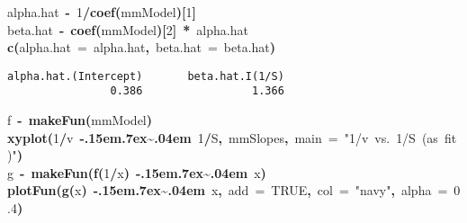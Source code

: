 \documentclass{article}\usepackage{graphicx, color}
\makeatletter
\newcommand{\hlnumber}[1]{\textcolor[rgb]{0,0,0}{#1}}%
\newcommand{\hlfunctioncall}[1]{\textcolor[rgb]{0.501960784313725,0,0.329411764705882}{\textbf{#1}}}%
\newcommand{\hlstring}[1]{\textcolor[rgb]{0.6,0.6,1}{#1}}%
\newcommand{\hlkeyword}[1]{\textcolor[rgb]{0,0,0}{\textbf{#1}}}%
\newcommand{\hlargument}[1]{\textcolor[rgb]{0.690196078431373,0.250980392156863,0.0196078431372549}{#1}}%
\newcommand{\hlassignement}[1]{\textcolor[rgb]{0,0,0}{\textbf{#1}}}%
\newcommand{\hlsymbol}[1]{\textcolor[rgb]{0,0,0}{#1}}%
\def\urltilda{\kern -.15em\lower .7ex\hbox{\~{}}\kern .04em}%
\newcommand{\hlstd}[1]{\textcolor[rgb]{0,0,0}{#1}}%
\newenvironment{kframe}{%
 \def\FrameCommand##1{\hskip\@totalleftmargin \hskip-\fboxsep
 \colorbox{shadecolor}{##1}\hskip-\fboxsep
     \hskip-\linewidth \hskip-\@totalleftmargin \hskip\columnwidth}%
 \MakeFramed {\advance\hsize-\width
   \@totalleftmargin\z@ \linewidth\hsize
   \@setminipage}}%
 {\par\unskip\endMakeFramed}
\newenvironment{knitrout}{}{} %
\makeatother
\begin{document}
\begin{knitrout}
\begin{kframe}
\begin{verbatim}
\end{verbatim}
\begin{flushleft}
\ttfamily\noindent
\hlsymbol{alpha.hat}{\ }\hlassignement{\usebox{\hlnormalsizeboxlessthan}-}{\ }\hlnumber{1}\hlkeyword{/}\hlfunctioncall{coef}\hlkeyword{(}\hlsymbol{mmModel}\hlkeyword{)}\hlkeyword{[}\hlnumber{1}\hlkeyword{]}\hspace*{\fill}\\
\hlstd{}\hlsymbol{beta.hat}{\ }\hlassignement{\usebox{\hlnormalsizeboxlessthan}-}{\ }\hlfunctioncall{coef}\hlkeyword{(}\hlsymbol{mmModel}\hlkeyword{)}\hlkeyword{[}\hlnumber{2}\hlkeyword{]}{\ }\hlkeyword{*}{\ }\hlsymbol{alpha.hat}\hspace*{\fill}\\
\hlstd{}\hlfunctioncall{c}\hlkeyword{(}\hlargument{alpha.hat}{\ }\hlargument{=}{\ }\hlsymbol{alpha.hat}\hlkeyword{,}{\ }\hlargument{beta.hat}{\ }\hlargument{=}{\ }\hlsymbol{beta.hat}\hlkeyword{)}\mbox{}
\normalfont
\end{flushleft}
\begin{verbatim}
alpha.hat.(Intercept)       beta.hat.I(1/S) 
                0.386                 1.366 
\end{verbatim}
\begin{flushleft}
\ttfamily\noindent
\hlsymbol{f}{\ }\hlassignement{\usebox{\hlnormalsizeboxlessthan}-}{\ }\hlfunctioncall{makeFun}\hlkeyword{(}\hlsymbol{mmModel}\hlkeyword{)}\hspace*{\fill}\\
\hlstd{}\hlfunctioncall{xyplot}\hlkeyword{(}\hlnumber{1}\hlkeyword{/}\hlsymbol{v}{\ }\hlkeyword{\urltilda{}}{\ }\hlnumber{1}\hlkeyword{/}\hlsymbol{S}\hlkeyword{,}{\ }\hlsymbol{mmSlopes}\hlkeyword{,}{\ }\hlargument{main}{\ }\hlargument{=}{\ }\hlstring{"{}{}1/v{\ }vs.{\ }1/S{\ }(as{\ }fit)"{}{}}\hlkeyword{)}\hspace*{\fill}\\
\hlstd{}\hlsymbol{g}{\ }\hlassignement{\usebox{\hlnormalsizeboxlessthan}-}{\ }\hlfunctioncall{makeFun}\hlkeyword{(}\hlfunctioncall{f}\hlkeyword{(}\hlnumber{1}\hlkeyword{/}\hlsymbol{x}\hlkeyword{)}{\ }\hlkeyword{\urltilda{}}{\ }\hlsymbol{x}\hlkeyword{)}\hspace*{\fill}\\
\hlstd{}\hlfunctioncall{plotFun}\hlkeyword{(}\hlfunctioncall{g}\hlkeyword{(}\hlsymbol{x}\hlkeyword{)}{\ }\hlkeyword{\urltilda{}}{\ }\hlsymbol{x}\hlkeyword{,}{\ }\hlargument{add}{\ }\hlargument{=}{\ }\hlnumber{TRUE}\hlkeyword{,}{\ }\hlargument{col}{\ }\hlargument{=}{\ }\hlstring{"{}{}navy"{}{}}\hlkeyword{,}{\ }\hlargument{alpha}{\ }\hlargument{=}{\ }\hlnumber{0.4}\hlkeyword{)}\hspace*{\fill}\\

\end{flushleft}
\end{kframe}
\end{knitrout}
\end{document}
